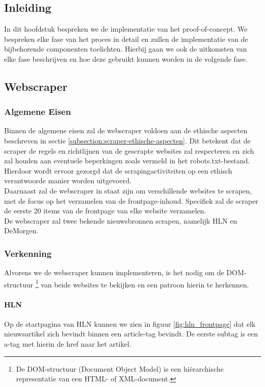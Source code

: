 \chapter{}%
\label{ch:proof-of-concept}
\section{Inleiding}
In dit hoofdstuk bespreken we de implementatie van het proof-of-concept. We bespreken elke fase van het proces in detail en zullen de implementatie van de bijbehorende componenten toelichten. Hierbij gaan we ook de uitkomsten van elke fase beschrijven en hoe deze  gebruikt kunnen worden in de volgende fase. 

\section{Webscraper}
\subsection{Algemene Eisen}
Binnen de algemene eisen zal de webscraper voldoen aan de ethische aspecten beschreven in sectie \ref{subsection:scraper-ethische-aspecten}. Dit betekent dat de scraper de regels en richtlijnen van de gescrapte websites zal respecteren en zich zal houden aan eventuele beperkingen zoals vermeld in het robots.txt-bestand. Hierdoor wordt ervoor gezorgd dat de scrapingactiviteiten op een ethisch verantwoorde manier worden uitgevoerd. \\

Daarnaast zal de webscraper in staat zijn om verschillende websites te scrapen, met de focus op het verzamelen van de frontpage-inhoud. Specifiek zal de scraper de eerste 20 items van de frontpage van elke website verzamelen. \\

De webscraper zal twee bekende nieuwsbronnen scrapen, namelijk HLN en DeMorgen.

\subsection{Verkenning}
Alvorens we de webscraper kunnen implementeren, is het nodig om de DOM-structuur \footnote{De DOM-structuur (Document Object Model) is een hiërarchische representatie van een HTML- of XML-document.} van beide websites te bekijken en een patroon hierin te herkennen. 
\subsubsection{HLN}
Op de startpagina van HLN kunnen we zien in figuur \ref{fig:hln_frontpage} dat elk nieuwsartikel zich bevindt binnen een article-tag bevindt. De eerste subtag is een a-tag met hierin de href naar het artikel. \\ 

